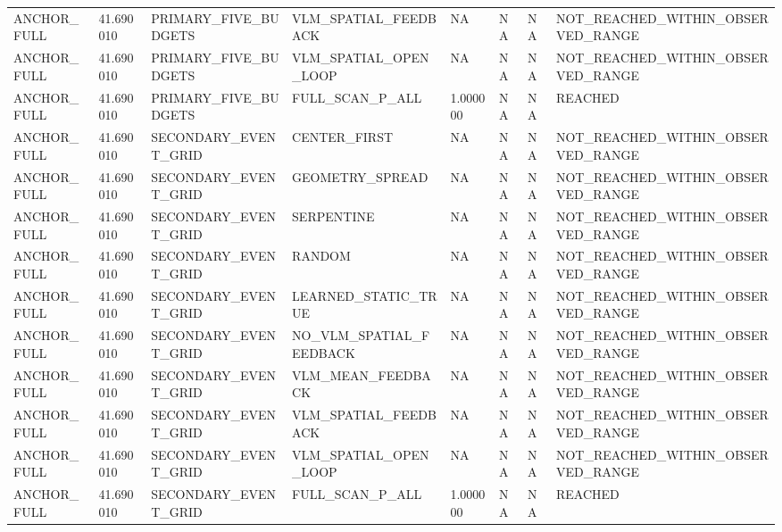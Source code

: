 \begin{tabular}{llllllll}
ANCHOR\_FULL & 41.690010 & PRIMARY\_FIVE\_BUDGETS & VLM\_SPATIAL\_FEEDBACK & NA & NA & NA & NOT\_REACHED\_WITHIN\_OBSERVED\_RANGE \\
ANCHOR\_FULL & 41.690010 & PRIMARY\_FIVE\_BUDGETS & VLM\_SPATIAL\_OPEN\_LOOP & NA & NA & NA & NOT\_REACHED\_WITHIN\_OBSERVED\_RANGE \\
ANCHOR\_FULL & 41.690010 & PRIMARY\_FIVE\_BUDGETS & FULL\_SCAN\_P\_ALL & 1.000000 & NA & NA & REACHED \\
ANCHOR\_FULL & 41.690010 & SECONDARY\_EVENT\_GRID & CENTER\_FIRST & NA & NA & NA & NOT\_REACHED\_WITHIN\_OBSERVED\_RANGE \\
ANCHOR\_FULL & 41.690010 & SECONDARY\_EVENT\_GRID & GEOMETRY\_SPREAD & NA & NA & NA & NOT\_REACHED\_WITHIN\_OBSERVED\_RANGE \\
ANCHOR\_FULL & 41.690010 & SECONDARY\_EVENT\_GRID & SERPENTINE & NA & NA & NA & NOT\_REACHED\_WITHIN\_OBSERVED\_RANGE \\
ANCHOR\_FULL & 41.690010 & SECONDARY\_EVENT\_GRID & RANDOM & NA & NA & NA & NOT\_REACHED\_WITHIN\_OBSERVED\_RANGE \\
ANCHOR\_FULL & 41.690010 & SECONDARY\_EVENT\_GRID & LEARNED\_STATIC\_TRUE & NA & NA & NA & NOT\_REACHED\_WITHIN\_OBSERVED\_RANGE \\
ANCHOR\_FULL & 41.690010 & SECONDARY\_EVENT\_GRID & NO\_VLM\_SPATIAL\_FEEDBACK & NA & NA & NA & NOT\_REACHED\_WITHIN\_OBSERVED\_RANGE \\
ANCHOR\_FULL & 41.690010 & SECONDARY\_EVENT\_GRID & VLM\_MEAN\_FEEDBACK & NA & NA & NA & NOT\_REACHED\_WITHIN\_OBSERVED\_RANGE \\
ANCHOR\_FULL & 41.690010 & SECONDARY\_EVENT\_GRID & VLM\_SPATIAL\_FEEDBACK & NA & NA & NA & NOT\_REACHED\_WITHIN\_OBSERVED\_RANGE \\
ANCHOR\_FULL & 41.690010 & SECONDARY\_EVENT\_GRID & VLM\_SPATIAL\_OPEN\_LOOP & NA & NA & NA & NOT\_REACHED\_WITHIN\_OBSERVED\_RANGE \\
ANCHOR\_FULL & 41.690010 & SECONDARY\_EVENT\_GRID & FULL\_SCAN\_P\_ALL & 1.000000 & NA & NA & REACHED \\
\hline
\end{tabular}
